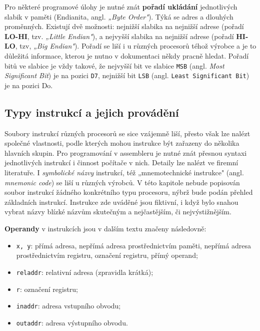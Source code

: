         Pro některé programové úlohy je nutné znát \textbf{pořadí ukládání} jednotlivých slabik v 
        paměti (Endianita, angl. \emph{„Byte Order"}). Týká se adres a dlouhých proměnných. 
        Existují dvě možnosti: nejnižší slabika na nejnižší adrese (pořadí \textbf{LO-HI}, tzv. 
        \emph{„Little Endian"}), a nejvyšší slabika na nejnižší adrese (pořadí \textbf{HI-LO}, tzv, 
        \emph{„Big Endian"}). Pořadí se liší i u různých procesorů téhož výrobce a je to důležitá 
        informace, kterou je nutno v dokumentaci někdy pracně hledat. Pořadí bitů ve slabice je 
        vždy takové, že nejvyšší bit ve slabice \texttt{MSB} (angl. \emph{Most Significant Bit}) je 
        na pozici \texttt{D7}, nejnižší bit \texttt{LSB} (angl. \texttt{Least Significant Bit}) je 
        na pozici Do.
        
    \subsection{Typy instrukcí a jejich provádění}\label{ces:IchapIVsecIIssecVI}
        Soubory instrukcí různých procesorů se sice vzájemně liší, přesto však lze nalézt společné 
        vlastnosti, podle kterých mohou instrukce být zařazeny do několika hlavních skupin. Pro 
        programování v assembleru je nutné znát přesnou syntaxi jednotlivých instrukcí i činnost 
        počítače v nich. Detaily lze nalézt ve firemní literatuře. I \emph{symbolické názvy} 
        instrukcí, též „mnemotechnické instrukce" (angl. \emph{mnemonic code}) se liší u různých 
        výrobců. V této kapitole nebude popisován soubor instrukcí žádného konkrétního typu 
        procesoru, nýbrž bude podán přehled základních instrukcí. Instrukce zde uváděné jsou 
        fiktivní, i když bylo snahou vybrat názvy blízké názvům skutečným a nejčastějším, či 
        nejvýstižnějším.
        
        \textbf{Operandy} v instrukcích jsou v dalším textu značeny následovně:
        \begin{itemize}[noitemsep]
          \item \texttt{x, y}: přímá adresa, nepřímá adresa prostřednictvím paměti, nepřímá  
                adresa prostřednictvím registru, označení registru, přímý operand;
          \item \texttt{reladdr}: relativní adresa (zpravidla krátká);
          \item \texttt{r}: označení registru;
          \item \texttt{inaddr}: adresa vstupního obvodu;
          \item \texttt{outaddr}: adresa výstupního obvodu.          
        \end{itemize}
        
